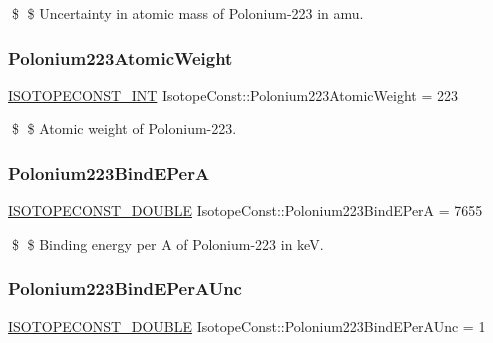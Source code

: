 \$ \$ Uncertainty in atomic mass of Polonium-\/223 in amu. \mbox{\label{group___isotope_const-_polonium-_po223_gaeb4397bdc61fd7dc8ca29ec0ee6db1eb}} 
\subsubsection{\texorpdfstring{Polonium223\+Atomic\+Weight}{Polonium223AtomicWeight}}
{\footnotesize\ttfamily \mbox{\hyperlink{group___isotope_const-_macros_ga5f18360b3e99483a35c32d789e62621c}{I\+S\+O\+T\+O\+P\+E\+C\+O\+N\+S\+T\+\_\+\+I\+NT}} Isotope\+Const\+::\+Polonium223\+Atomic\+Weight = 223}

\$ \$ Atomic weight of Polonium-\/223. \mbox{\label{group___isotope_const-_polonium-_po223_ga71487834e6958ea51103f31c39f93142}} 
\subsubsection{\texorpdfstring{Polonium223\+Bind\+E\+PerA}{Polonium223BindEPerA}}
{\footnotesize\ttfamily \mbox{\hyperlink{group___isotope_const-_macros_ga8f45a7272ce02c0b4c65c44636ed719a}{I\+S\+O\+T\+O\+P\+E\+C\+O\+N\+S\+T\+\_\+\+D\+O\+U\+B\+LE}} Isotope\+Const\+::\+Polonium223\+Bind\+E\+PerA = 7655}

\$ \$ Binding energy per A of Polonium-\/223 in keV. \mbox{\label{group___isotope_const-_polonium-_po223_ga4973ffe07b9b216ec2351d7a58136284}} 
\subsubsection{\texorpdfstring{Polonium223\+Bind\+E\+Per\+A\+Unc}{Polonium223BindEPerAUnc}}
{\footnotesize\ttfamily \mbox{\hyperlink{group___isotope_const-_macros_ga8f45a7272ce02c0b4c65c44636ed719a}{I\+S\+O\+T\+O\+P\+E\+C\+O\+N\+S\+T\+\_\+\+D\+O\+U\+B\+LE}} Isotope\+Const\+::\+Polonium223\+Bind\+E\+Per\+A\+Unc = 1}

